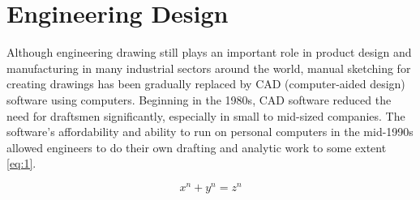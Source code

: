 \chapter{Engineering Design}

Although engineering drawing still plays an important role in product design and manufacturing in many industrial sectors around the world, manual sketching for creating drawings has been gradually replaced by CAD (computer-aided design) software using computers. Beginning in the 1980s, CAD software reduced the need for draftsmen significantly, especially in small to mid-sized companies. The software’s affordability and ability to run on personal computers in the mid-1990s allowed engineers to do their own drafting and analytic work to some extent \ref{eq:1}.

\begin{equation}
x^n + y^n = z^n
\label{eq:1}
\end{equation}
